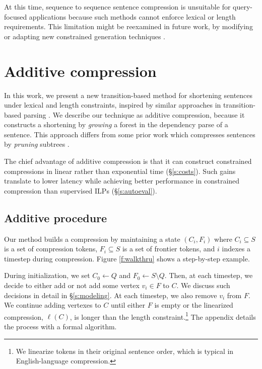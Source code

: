 \documentclass[11pt,a4paper]{article}
\begin{document}
At this time, sequence to sequence sentence compression \cite{filippova2015sentence} is unsuitable for query-focused applications because such methods cannot enforce lexical or length requirements. This limitation might be reexamined in future work, by modifying or adapting new constrained generation techniques \cite{N18-1119,aaimh}.

\section{Additive compression}\label{s:system}

In this work, we present a new transition-based method for shortening sentences under lexical and length constraints, inspired by similar approaches in transition-based parsing \cite{nivre2003}. We describe our technique as additive compression, because it constructs a shortening by \textit{growing} a forest in the dependency parse of a sentence. This approach differs from some prior work which
compresses sentences by \textit{pruning} subtrees \cite{Jing2000SentenceRF,Knight2000StatisticsBasedS,berg2011jointly,almeida2013fast,Filippova2015FastKS,filippova2015sentence}. 

The chief advantage of additive compression is that it can construct constrained compressions in linear rather than exponential time (\S\ref{s:costs}). Such gains translate to lower latency while achieving better performance in constrained compression than supervised ILPs (\S\ref{s:autoeval}).

\subsection{Additive procedure}\label{s:formal}

Our method builds a compression by maintaining a state
$(C_i,F_i)$ where $C_i \subseteq S$ is a set of compression tokens, $F_i  \subseteq S$ is a set of frontier tokens, and $i$ indexes a timestep during compression. Figure \ref{f:walkthru} shows a step-by-step example. 

During initialization, we set $C_0 \gets Q$ and $F_0 \gets S \setminus Q$. Then, at each timestep, we decide to either add or not add some vertex $v_i \in F$ to $C$. We discuss such decisions in detail in \S\ref{s:modeling}. At each timestep, we also remove $v_i$ from $F$. We continue adding vertexes to $C$ until either $F$ is empty or the linearized compression, $\ell(C)$, is longer than the length constraint.\footnote{We linearize tokens in their original sentence order, which is typical in English-language compression.} The appendix details the process with a formal algorithm.
\end{document}
